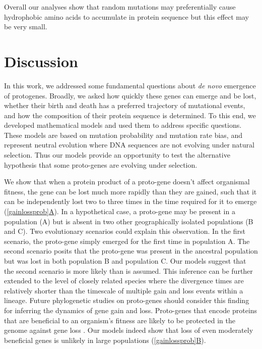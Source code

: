 \documentclass[12pt,a4paper]{article}
\newcommand{\cmnt}[1]{{\color{purple} #1}}
\begin{document}
Overall our analyses show that random mutations may preferentially cause hydrophobic amino acids to accumulate in protein sequence but this effect may be very small.

\section{Discussion} 

In this work, we addressed some fundamental questions about \textit{de novo} emergence of protogenes. Broadly, we asked how quickly these genes can emerge and be lost, whether their birth and death has a preferred trajectory of mutational events, and how the composition of their protein sequence is determined. To this end, we developed mathematical models and used them to address specific questions. These models are based on mutation probability and mutation rate bias, and represent neutral evolution where DNA sequences are not evolving under natural selection. Thus our models provide an opportunity to test the alternative hypothesis that some proto-genes are evolving under selection.

We show that when a protein product of a proto-gene doesn't affect organismal fitness, the gene can be lost much more rapidly than they are gained, such that it can be independently lost two to three times in the time required for it to emerge (\hyperref[gainlossprob]{\autoref{gainlossprob}A}). In a hypothetical case, a proto-gene may be present in a population (A) but is absent in two other geographically isolated populations (B and C). Two evolutionary scenarios could explain this observation. In the first scenario, the proto-gene simply emerged for the first time in population A. The second scenario posits that the proto-gene was present in the ancestral population but was lost in both population B and population C. Our models suggest that the second scenario is more likely than is assumed. \cmnt{This inference can be further extended to the level of closely related species where the divergence times are relatively shorter than the timescale of multiple gain and loss events within a lineage}. Future phylogenetic studies on proto-genes should consider this finding for inferring the dynamics of gene gain and loss. \cmnt{Proto-genes that encode proteins that are beneficial to an organism's fitness are likely to be protected in the genome against gene loss \citep{Lee2019}. Our models indeed show that loss of even moderately beneficial genes is unlikely in large populations (\hyperref[gainlossprob]{\autoref{gainlossprob}B})}.
\end{document}
